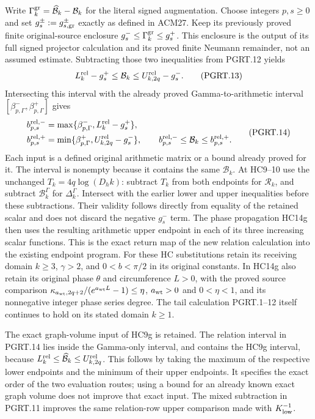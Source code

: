 Write $\Gamma_k^{\rm gr}=\widehat{\mathcal B}_k-\mathcal B_k$
for the literal signed augmentation. Choose integers $p,s\geq0$ and
set $g_s^\pm:=g_{s,\rm gr}^\pm$ exactly as defined in ACM27.
Keep its previously proved finite original-source enclosure
$g_s^-\leq\Gamma_k^{\rm gr}\leq g_s^+$. This enclosure is the output of its full signed projector
calculation and its proved finite Neumann remainder, not an assumed
estimate. Subtracting those two inequalities from PGRT.12 yields
\[
 L_k^{\rm rel}-g_s^+\leq\mathcal B_k
                  \leq U_{k,2q}^{\rm rel}-g_s^-.
\tag{PGRT.13}\label{eq:pgrt-arithmetic-return}
\]
Intersecting this interval with the already proved Gamma-to-arithmetic
interval $[\beta_{p,\Gamma}^-,\beta_{p,\Gamma}^+]$ gives
\[
\begin{aligned}
 b_{p,s}^{\rm rel,-}
 &=\max\{\beta_{p,\Gamma}^-,L_k^{\rm rel}-g_s^+\},\\
 b_{p,s}^{\rm rel,+}
 &=\min\{\beta_{p,\Gamma}^+,U_{k,2q}^{\rm rel}-g_s^-\},\qquad
 b_{p,s}^{\rm rel,-}\leq\mathcal B_k\leq b_{p,s}^{\rm rel,+}.
\end{aligned}
\tag{PGRT.14}\label{eq:pgrt-current-interval}
\]
Each input is a defined original arithmetic matrix or a bound already
proved for it. The interval is nonempty because it contains the same
$\mathcal B_k$. At HC9--10 use the unchanged $T_k=4q\log(D_hk)$:
subtract $T_k$ from both endpoints for $\mathcal R_k$, and subtract
$\mathcal B_k^\Gamma$ for $\Delta_k^\Gamma$. Intersect with the
earlier lower and upper inequalities before these subtractions.
Their validity follows directly from equality of the retained scalar
and does not discard the negative $g_s^-$ term. The phase propagation
HC14g then uses the resulting arithmetic upper endpoint in each of
its three increasing scalar functions. This is the exact return map
of the new relation calculation into the existing endpoint program.
For these HC substitutions retain its receiving domain $k\geq3$,
$\gamma>2$, and $0<b<\pi/2$ in its original constants. In HC14g
also retain its original phase $\theta$ and circumference $L>0$,
with the proved source comparison
$\kappa_{a_{\rm wt},2q+2}/(e^{a_{\rm wt}L}-1)\leq\eta$,
$a_{\rm wt}>0$ and $0<\eta<1$, and its nonnegative integer phase
series degree. The tail calculation PGRT.1--12 itself continues
to hold on its stated domain $k\geq1$.

The exact graph-volume input of HC9g is retained. The relation
interval in PGRT.14 lies inside the Gamma-only interval, and
contains the HC9g interval, because
$L_k^{\rm rel}\leq\widehat{\mathcal B}_k\leq U_{k,2q}^{\rm rel}$.
This follows by taking the maximum of the respective lower
endpoints and the minimum of their upper endpoints. It specifies
the exact order of the two evaluation routes; using a bound for
an already known exact graph volume does not improve that exact
input. The mixed subtraction in PGRT.11 improves the same
relation-row upper comparison made with $K_{\rm low}^{-1}$.


